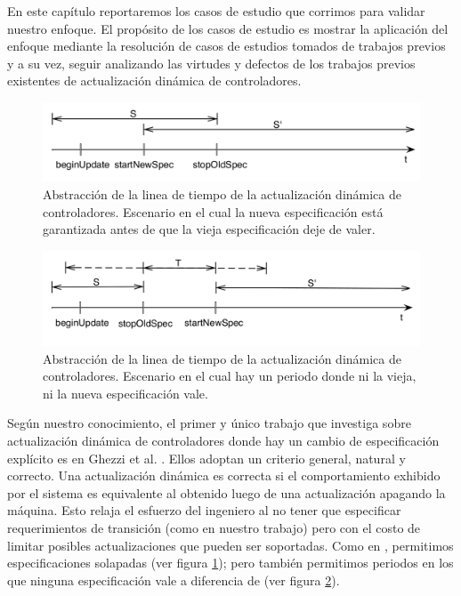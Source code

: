 En este capítulo reportaremos los casos de estudio que corrimos para validar nuestro enfoque. El propósito de los casos
de estudio es mostrar la aplicación del enfoque mediante la resolución de casos de estudios tomados de trabajos previos
y a su vez, seguir analizando las virtudes y defectos de los trabajos previos existentes de actualización dinámica de
controladores.

\begin{figure}
\centering
\includegraphics[scale=0.35]{img/overlaping.png}
\caption{Abstracción de la linea de tiempo de la actualización dinámica de controladores. Escenario en el cual la nueva
especificación está garantizada antes de que la vieja especificación deje de valer.}
\label{overlaping}
\end{figure}

\begin{figure}
\centering
\includegraphics[scale=0.35]{img/transition.png}
\caption{Abstracción de la linea de tiempo de la actualización dinámica de controladores. Escenario en el cual hay un
periodo donde ni la vieja, ni la nueva especificación vale.}
\label{transition}
\end{figure}

Según nuestro conocimiento, el primer y único trabajo que investiga sobre actualización dinámica de controladores donde
hay un cambio de especificación explícito es en Ghezzi et al. \cite{6224401}. Ellos adoptan un criterio general,
natural y correcto. Una actualización dinámica es correcta si el comportamiento exhibido por el sistema es equivalente
al obtenido luego de una actualización apagando la máquina. Esto relaja el esfuerzo del ingeniero al no tener que
especificar requerimientos de transición (como en nuestro trabajo) pero con el costo de limitar posibles actualizaciones
que pueden ser soportadas. Como en \cite{6224401}, permitimos especificaciones solapadas (ver figura \ref{overlaping}); pero
también permitimos periodos en los que ninguna especificación vale a diferencia de \cite{6224401} (ver figura
\ref{transition}).


